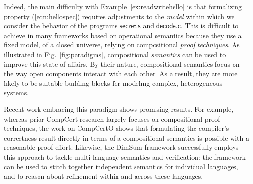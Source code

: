 \documentclass[acmsmall,screen,review,anonymous,nonacm]{acmart}
\newcommand{\kw}[1]{\ensuremath{ \mathsf{#1} }}
\begin{document}
Indeed,
the main difficulty with Example~\ref{ex:readwritehello}
is that formalizing property (\ref{eqn:hellospec})
requires adjustments to the \emph{model}
within which we consider the behavior of
the programs \kw{secret.s} and \kw{decode.c}.
This is difficult to achieve
in many frameworks based on operational semantics
because they use a fixed model, of a closed universe,
relying on compositional \emph{proof techniques}.
%
As illustrated in Fig.~\ref{fig:paradigms},
compositional \emph{semantics} can be used to improve
this state of affairs.
By their nature,
compositional semantics focus on
the way
open components
interact with each other.
As a result,
they are more likely to be suitable
building blocks for
modeling complex, heterogeneous systems.

Recent work embracing this paradigm shows promising results.
For example,
whereas prior CompCert research
largely focuses on compositional proof techniques,
the work on CompCertO \cite{compcerto}
shows that formulating the compiler's correctness result
directly in terms of a compositional semantics
is possible with a reasonable proof effort.
Likewise,
the DimSum framework \cite{dimsum}
successfully employs this approach to tackle
multi-language semantics and verification:
the framework can be used to stitch together
independent semantics for individual languages,
and to reason about refinement within and across
these languages.

%
\end{document}
